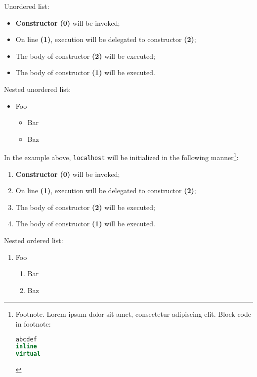 \documentclass[twoside,10pt,letterpaper,usenames]{newstyle-PearsonGeneric-7-38}
\begin{document}
Unordered list:

\begin{itemize}
\item{\textbf{Constructor} \textbf{(0)} will be invoked;}
\item{On line \textbf{(1)}, execution will be delegated to constructor \textbf{(2)};}
\item{The body of constructor \textbf{(2)} will be executed;}
\item{The body of constructor \textbf{(1)} will be executed.}
\end{itemize}

Nested unordered list:

\begin{itemize}
\item{Foo\begin{itemize}
\item{Bar}
\item{Baz}
\end{itemize}
}
\end{itemize}

In the example above, \texttt{localhost} will be initialized in the
following manner{\cprotect\footnote{Footnote. Lorem ipsum dolor sit
amet, consectetur adipiscing elit. Block code in footnote:

\begin{lstlisting}[language=C++, basicstyle={\ttfamily\footnotesize}]
abcdef
inline
virtual
\end{lstlisting}
}}:

\begin{enumerate}
\item{\textbf{Constructor} \textbf{(0)} will be invoked;}
\item{On line \textbf{(1)}, execution will be delegated to constructor \textbf{(2)};}
\item{The body of constructor \textbf{(2)} will be executed;}
\item{The body of constructor \textbf{(1)} will be executed.}
\end{enumerate}

Nested ordered list:

\begin{enumerate}
\item{Foo\begin{enumerate}
\item{Bar}
\item{Baz}
\end{enumerate}
}
\end{enumerate}
\end{document}
